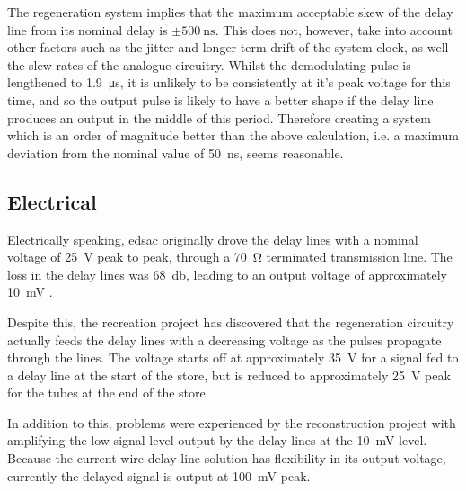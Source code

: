 \newcommand{\maxJitterPlusSkewNs}{50} %

The regeneration system implies that the maximum acceptable skew of the delay line from its nominal delay is $\pm\SI{500}{\nano\second}$. This does not, however, take into account other factors such as the jitter and longer term drift of the system clock, as well the slew rates of the analogue circuitry. Whilst the demodulating pulse is lengthened to \SI{1.9}{\micro\second}, it is unlikely to be consistently at it's peak voltage for this time, and so the output pulse is likely to have a better shape if the delay line produces an output in the middle of this period. Therefore creating a system which is an order of magnitude better than the above calculation, i.e. a maximum deviation from the nominal value of \SI{\maxJitterPlusSkewNs}{\nano\second}, seems reasonable.

\subsection{Electrical} \label{sec:review-delay-electrical}

\newcommand{\maxDelayInputV}{35}
\newcommand{\minDelayInputV}{25}

\newcommand{\maxDelayOutputmV}{100}
\newcommand{\minDelayOutputmV}{10}


Electrically speaking, \gls{edsac} originally drove the delay lines with a nominal voltage of \SI{25}{\volt} peak to peak, through a \SI{70}{\ohm} terminated transmission line. The loss in the delay lines was \SI{68}{\decibel}, leading to an output voltage of approximately \SI{10}{\milli\volt} \cite[p.212]{wilkes1948}.

Despite this, the recreation project has discovered that the regeneration circuitry actually feeds the delay lines with a decreasing voltage as the pulses propagate through the lines. The voltage starts off at approximately \SI{\maxDelayInputV}{\volt} for a signal fed to a delay line at the start of the store, but is reduced to approximately \SI{\minDelayInputV}{\volt} peak for the tubes at the end of the store.

In addition to this, problems were experienced by the reconstruction project with amplifying the low signal level output by the delay lines at the \SI{10}{\milli\volt} level. Because the current wire delay line solution has flexibility in its output voltage, currently the delayed signal is output at \SI{100}{\milli\volt} peak.


